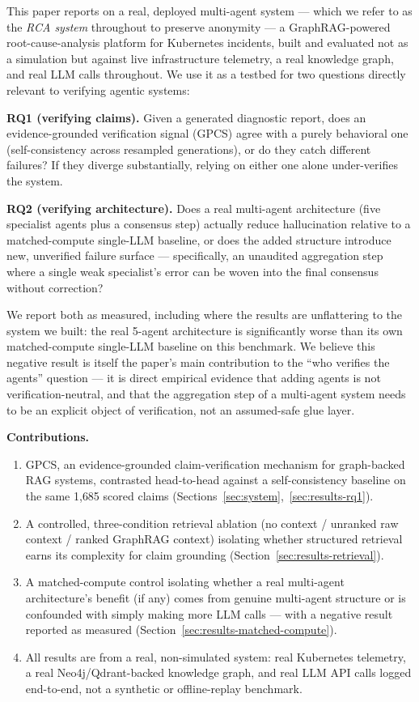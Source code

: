 \documentclass{article}
\begin{document}
This paper reports on a real, deployed multi-agent system --- which we
refer to as the \emph{RCA system} throughout to preserve anonymity --- a
GraphRAG-powered root-cause-analysis platform for Kubernetes incidents,
built and evaluated not as a simulation but against live infrastructure
telemetry, a real knowledge graph, and real LLM calls throughout. We use
it as a testbed for two questions directly relevant to verifying agentic
systems:

\textbf{RQ1 (verifying claims).} Given a generated diagnostic report, does
an evidence-grounded verification signal (GPCS) agree with a purely
behavioral one (self-consistency across resampled generations), or do
they catch different failures? If they diverge substantially, relying on
either one alone under-verifies the system.

\textbf{RQ2 (verifying architecture).} Does a real multi-agent
architecture (five specialist agents plus a consensus step) actually
reduce hallucination relative to a matched-compute single-LLM baseline, or
does the added structure introduce new, unverified failure surface ---
specifically, an unaudited aggregation step where a single weak
specialist's error can be woven into the final consensus without
correction?

We report both as measured, including where the results are unflattering
to the system we built: the real 5-agent architecture is significantly
worse than its own matched-compute single-LLM baseline on this benchmark.
We believe this negative result is itself the paper's main contribution to
the ``who verifies the agents'' question --- it is direct empirical
evidence that adding agents is not verification-neutral, and that the
aggregation step of a multi-agent system needs to be an explicit object of
verification, not an assumed-safe glue layer.

\textbf{Contributions.}
\begin{enumerate}
    \item GPCS, an evidence-grounded claim-verification mechanism for
    graph-backed RAG systems, contrasted head-to-head against a
    self-consistency baseline on the same 1{,}685 scored claims
    (Sections~\ref{sec:system},~\ref{sec:results-rq1}).
    \item A controlled, three-condition retrieval ablation (no context /
    unranked raw context / ranked GraphRAG context) isolating whether
    structured retrieval earns its complexity for claim grounding
    (Section~\ref{sec:results-retrieval}).
    \item A matched-compute control isolating whether a real multi-agent
    architecture's benefit (if any) comes from genuine multi-agent
    structure or is confounded with simply making more LLM calls --- with
    a negative result reported as measured
    (Section~\ref{sec:results-matched-compute}).
    \item All results are from a real, non-simulated system: real
    Kubernetes telemetry, a real Neo4j/Qdrant-backed knowledge graph, and
    real LLM API calls logged end-to-end, not a synthetic or
    offline-replay benchmark.
\end{enumerate}
\end{document}
